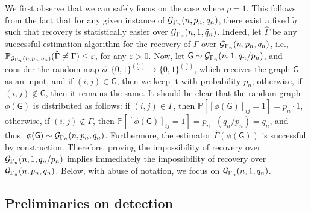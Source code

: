 \documentclass[12pt]{article}
\newcommand {\pr} {\mathbb{P}}
\newcommand{\calG}{{\cal G}}
\newcommand{\p}[1]{\left(#1\right)}
\newcommand{\pp}[1]{\left[#1\right]}
\newcommand{\s}[1]{\mathsf{#1}}
\begin{document}
We first observe that we can safely focus on the case where $p=1$. This follows from the fact that for any given instance of $\calG_{\Gamma_n}(n,p_n,q_n)$, there exist a fixed $\tilde{q}$ such that recovery is statistically easier over $\calG_{\Gamma_n}(n,1,\tilde{q}_n)$. Indeed, let $\hat{\Gamma}$ be any successful estimation algorithm for the recovery of $\Gamma$ over $\calG_{\Gamma_n}(n,p_n,q_n)$, i.e., $\pr_{\calG_{\Gamma_n}(n,p_n,q_n)}(\hat{\Gamma}\neq\Gamma)\leq\varepsilon$, for any $\varepsilon>0$. Now, let $\s{G}\sim\calG_{\Gamma_n}(n,1,q_n/p_n)$, and consider the random map $\phi:\{0,1\}^{\binom{n}{2}}\to\{0,1\}^{\binom{n}{2}}$, which receives the graph $\s{G}$ as an input, and if $(i,j)\in\s{G}$, then we keep it with probability $p_n$, otherwise, if $(i,j)\not\in\s{G}$, then it remains the same. It should be clear that the random graph $\phi(\s{G})$ is distributed as follows: if $(i,j)\in\Gamma$, then $\pr\pp{[\phi(\s{G})]_{ij}=1}=p_n\cdot 1$, otherwise, if $(i,j)\not\in\Gamma$, then $\pr\pp{[\phi(\s{G})]_{ij}=1}=p_n\cdot\p{q_n/p_n} = q_n$, and thus, $\phi(\s{G})\sim\calG_{\Gamma_n}(n,p_n,q_n)$. Furthermore, the estimator $\hat{\Gamma}(\phi(\s{G}))$ is successful by construction. Therefore, proving the impossibility of recovery over $\calG_{\Gamma_n}(n,1,q_n/p_n)$ implies immediately the impossibility of recovery over $\calG_{\Gamma_n}(n,p_n,q_n)$. Below, with abuse of notation, we focus on $\calG_{\Gamma_n}(n,1,q_n)$.

\subsection{Preliminaries on detection}
\end{document}
